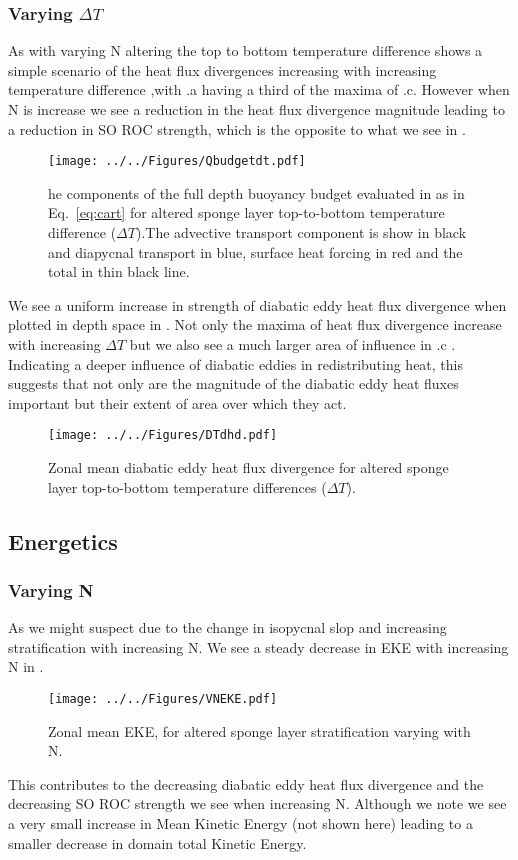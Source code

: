 \subsubsection*{Varying $\Delta T$}
As with varying N altering the top to bottom temperature difference shows a simple scenario of the heat flux divergences increasing with increasing temperature difference ,with .a having a third of the maxima of .c. However when N is increase we see a reduction in the heat flux divergence magnitude leading to a reduction in SO ROC strength, which is the opposite to what we see in .
\begin{figure}[H]
\center
\noindent \texttt{[image: ../../Figures/Qbudgetdt.pdf]} 
\caption{he components of the full depth buoyancy budget evaluated in as in Eq.~\ref{eq:cart} for altered sponge layer top-to-bottom temperature difference ($\Delta T$).The advective transport component is show in black and diapycnal transport in blue, surface heat forcing in red and the total in thin black line.}
\label{fig:QDT}
\end{figure}
We see a uniform increase in strength of diabatic eddy heat flux divergence when plotted in depth space in . Not only the maxima of heat flux divergence increase with increasing $\Delta T$ but we also see a much larger area of influence in .c . Indicating a deeper influence of diabatic eddies in redistributing heat, this suggests that not only are the magnitude of the diabatic eddy heat fluxes important but their extent of area over which they act. 
\begin{figure}[H]
\center
\noindent \texttt{[image: ../../Figures/DTdhd.pdf]} 
\caption{Zonal mean diabatic eddy heat flux divergence for altered sponge layer top-to-bottom temperature differences ($\Delta T$).}
\label{fig:DTdhd}
\end{figure}
\subsection{Energetics}
\subsubsection*{Varying N}
As we might suspect due to the change in isopycnal slop and increasing stratification with increasing N. We see a steady decrease in EKE with increasing N in .
\begin{figure}[H]
\noindent \texttt{[image: ../../Figures/VNEKE.pdf]} 
\caption{Zonal mean EKE, for  altered sponge layer stratification varying with N.}
\label{fig:VNEKE}
\end{figure}
This contributes to the decreasing diabatic eddy heat flux divergence and the decreasing SO ROC strength we see when increasing N. Although we note we see a very small increase in Mean Kinetic Energy (not shown here) leading to a smaller decrease in domain total Kinetic Energy.  
